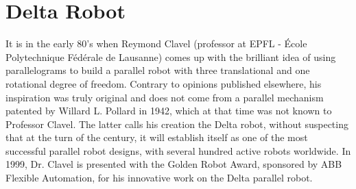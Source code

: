 \section{Delta Robot}
It is in the early 80's when Reymond Clavel (professor at EPFL - École Polytechnique Fédérale de Lausanne) comes up with the brilliant idea of using parallelograms to build a parallel robot with three translational and one rotational degree of freedom. Contrary to opinions published elsewhere, his inspiration was truly original and does not come from a parallel mechanism patented by Willard L. Pollard in 1942, which at that time was not known to Professor Clavel. The latter calls his creation the Delta robot, without suspecting that at the turn of the century, it will establish itself as one of the most successful parallel robot designs, with several hundred active robots worldwide. In 1999, Dr. Clavel is presented with the Golden Robot Award, sponsored by ABB Flexible Automation, for his innovative work on the Delta parallel robot\cite{intro_deltarobot_thesis}. 
